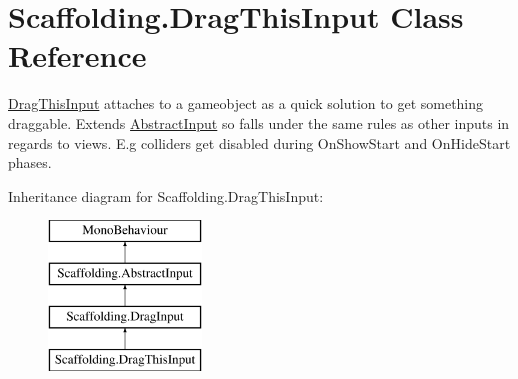 \hypertarget{class_scaffolding_1_1_drag_this_input}{\section{Scaffolding.\-Drag\-This\-Input Class Reference}
\label{class_scaffolding_1_1_drag_this_input}
}


\hyperlink{class_scaffolding_1_1_drag_this_input}{Drag\-This\-Input} attaches to a gameobject as a quick solution to get something draggable. Extends \hyperlink{class_scaffolding_1_1_abstract_input}{Abstract\-Input} so falls under the same rules as other inputs in regards to views. E.\-g colliders get disabled during On\-Show\-Start and On\-Hide\-Start phases.  


Inheritance diagram for Scaffolding.\-Drag\-This\-Input\-:\begin{figure}[H]
\begin{center}
\leavevmode
\includegraphics[height=4.000000cm]{class_scaffolding_1_1_drag_this_input}
\end{center}
\end{figure}
